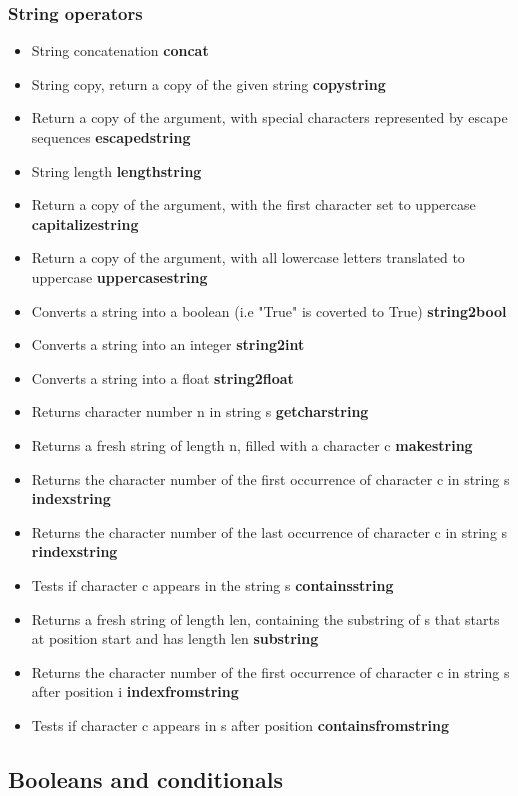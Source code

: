 \documentclass[12pt]{article}
\begin{document}
\subsubsection{String operators}
\begin{itemize}
\item String concatenation \textbf{concat}
\item String copy, return a copy of the given string \textbf{copystring}
\item Return a copy of the argument, with special characters represented by escape sequences \textbf{escapedstring}
\item String length \textbf{lengthstring}
\item Return a copy of the argument, with the first character set to uppercase \textbf{capitalizestring}
\item Return a copy of the argument, with all lowercase letters translated to uppercase \textbf{uppercasestring}
\item Converts a string into a boolean (i.e "True" is  coverted to True)  \textbf{string2bool}
\item Converts a string into an integer \textbf{string2int}
\item Converts a string into a float \textbf{string2float}
\item Returns character number n in string s \textbf{getcharstring}
\item Returns a fresh string of length n, filled with a character c \textbf{makestring}
\item Returns the character number of the first occurrence of character c in string s \textbf{indexstring}
\item Returns the character number of the last occurrence of character c in string s \textbf{rindexstring}
\item Tests if character c appears in the string s \textbf{containsstring}
\item Returns a fresh string of length len, containing the substring of s that starts at position start and has length len \textbf{substring}
\item Returns the character number of the first occurrence of character c in string s after position i \textbf{indexfromstring}
\item Tests if character c appears in s after position \textbf{containsfromstring}
\end{itemize}

\subsection{Booleans and conditionals}
\end{document}
